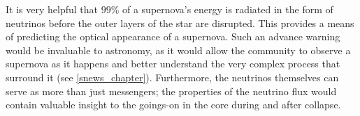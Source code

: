 		It is very helpful that $99\%$ of a supernova's energy is radiated in the form of neutrinos before the outer layers of the star are disrupted. This provides a means of predicting the optical appearance of a supernova. Such an advance warning would be invaluable to astronomy, as it would allow the community to observe a supernova as it happens and better understand the very complex process that surround it (see \CHP \ref{snews_chapter}). Furthermore, the neutrinos themselves can serve as more than just messengers; the properties of the neutrino flux would contain valuable insight to the goings-on in the core during and after collapse.


























